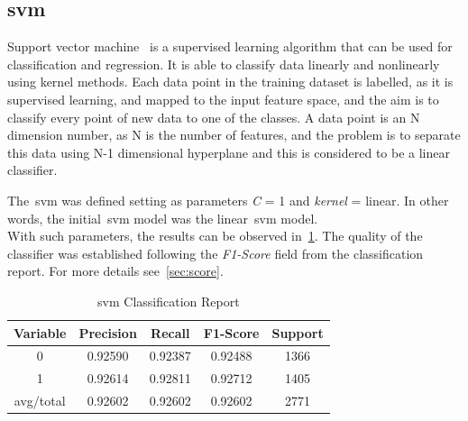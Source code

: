 \subsection{\acf{svm}}
Support vector machine~\cite{svm} is a supervised learning algorithm that can be used for classification and regression. It is able to classify data linearly and nonlinearly using kernel methods. Each data point in the training dataset is labelled, as it is supervised learning, and mapped to the input feature space, and the aim is to classify every point of new data to one of the classes. A data point is an N dimension number, as N is the number of features, and the problem is to separate this data using N-1 dimensional hyperplane and this is considered to be a linear classifier.\par
The~\ac{svm} was defined setting as parameters \textit{C} = 1 and \textit{kernel} = linear. In other words, the initial~\ac{svm} model was the linear~\ac{svm} model.\\
With such parameters, the results can be observed in~\cref{tab:sv1}. The quality of the classifier was established following the \textit{F1-Score} field from the classification report. For more details see~\cref{sec:score}. 

\begin{table}[h!]
	\centering
	\begin{tabular}{||c c c c c||} 
		\hline
		Variable & Precision & Recall & F1-Score & Support \\ [0.5ex] 
		\hline\hline
		0 & 0.92590 & 0.92387 & 0.92488 & 1366 \\ 
		1 & 0.92614 & 0.92811 & 0.92712 & 1405 \\
		avg/total & 0.92602 & 0.92602 & 0.92602 & 2771 \\
		[1ex] 
		\hline
	\end{tabular}
	\caption{\acl{svm} Classification Report}
	\label{tab:sv1}
\end{table}
